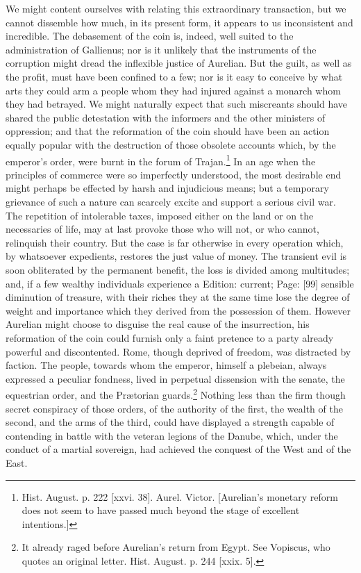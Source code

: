 We might content ourselves with relating this extraordinary transaction, but we cannot dissemble how much, in its present form, it appears to us inconsistent and incredible. The debasement of the coin is, indeed, well suited to the administration of Gallienus; nor is it unlikely that the instruments of the corruption might dread the inflexible justice of Aurelian. But the guilt, as well as the profit, must have been confined to a few; nor is it easy to conceive by what arts they could arm a people whom they had injured against a monarch whom they had betrayed. We might naturally expect that such miscreants should have shared the public detestation with the informers and the other ministers of oppression; and that the reformation of the coin should have been an action equally popular with the destruction of those obsolete accounts which, by the emperor\texthebrew{}’s order, were burnt in the forum of Trajan.\footnote{Hist. August. p. 222 [xxvi. 38]. Aurel. Victor. [Aurelian\texthebrew{}’s monetary reform does not seem to have passed much beyond the stage of excellent intentions.]} In an age when the principles of commerce were so imperfectly understood, the most desirable end might perhaps be effected by harsh and injudicious means; but a temporary grievance of such a nature can scarcely excite and support a serious civil war. The repetition of intolerable taxes, imposed either on the land or on the necessaries of life, may at last provoke those who will not, or who cannot, relinquish their country. But the case is far otherwise in every operation which, by whatsoever expedients, restores the just value of money. The transient evil is soon obliterated by the permanent benefit, the loss is divided among multitudes; and, if a few wealthy individuals experience a Edition: current; Page: [99] sensible diminution of treasure, with their riches they at the same time lose the degree of weight and importance which they derived from the possession of them. However Aurelian might choose to disguise the real cause of the insurrection, his reformation of the coin could furnish only a faint pretence to a party already powerful and discontented. Rome, though deprived of freedom, was distracted by faction. The people, towards whom the emperor, himself a plebeian, always expressed a peculiar fondness, lived in perpetual dissension with the senate, the equestrian order, and the Prætorian guards.\footnote{It already raged before Aurelian\texthebrew{}’s return from Egypt. See Vopiscus, who quotes an original letter. Hist. August. p. 244 [xxix. 5].} Nothing less than the firm though secret conspiracy of those orders, of the authority of the first, the wealth of the second, and the arms of the third, could have displayed a strength capable of contending in battle with the veteran legions of the Danube, which, under the conduct of a martial sovereign, had achieved the conquest of the West and of the East.

